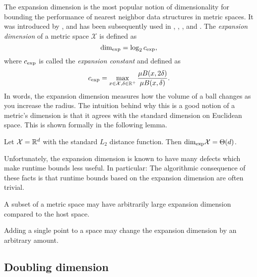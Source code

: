 \documentclass[../main.tex]{subfiles}
\newcommand{\set}[1]{\mathcal {#1}}
\newcommand{\krdim}{\text{dim}_\textnormal{exp}}
\newcommand{\cexp}{c_\textnormal{exp}}
\begin{document}
The expansion dimension is the most popular notion of dimensionality for bounding the performance of nearest neighbor data structures in metric spaces.
It was introduced by
\citet{karger2002finding},
and has been subsequently used in
\citet{krauthgamer2004navigating},
\citet{beygelzimer2006cover},
\citet{ram2009linear},
and \citet{curtin2015plug}.
The \emph{expansion dimension} of a metric space $\set X$ is defined as
\begin{equation}
    \krdim = \log_2 \cexp
    ,
\end{equation}
where $\cexp$ is called the \emph{expansion constant} and defined as
\begin{equation}
    \cexp = \max_{x\in\set X, \delta\in\R^+} \frac{\mu B(x,2\delta)}{\mu B(x,\delta)}
    .
\end{equation}
In words, the expansion dimension measures how the volume of a ball changes as you increase the radius.
The intuition behind why this is a good notion of a metric's dimension is that it agrees with the standard dimension on Euclidean space.
This is shown formally in the following lemma.
\begin{lemma}
    Let $\set X=\R^d$ with the standard $L_2$ distance function.
    Then $\krdim\set X=\Theta(d)$.
\end{lemma}
Unfortunately, the expansion dimension is known to have many defects which make runtime bounds less useful.
In particular:
The algorithmic consequence of these facts is that runtime bounds based on the expansion dimension are often trivial.

\begin{example}
    A subset of a metric space may have arbitrarily large expansion dimension compared to the host space.
\end{example}

\begin{example}
    Adding a single point to a space may change the expansion dimension by an arbitrary amount.
\end{example}


\subsection{Doubling dimension}
\end{document}

